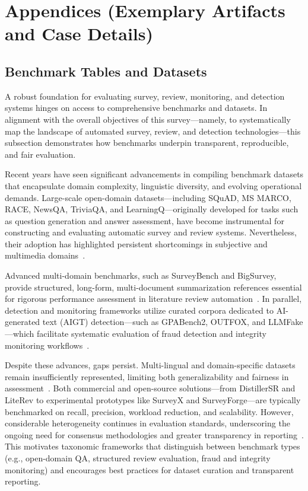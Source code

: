 \documentclass[sigconf]{acmart}
\begin{document}
\section{Appendices (Exemplary Artifacts and Case Details)}

\subsection{Benchmark Tables and Datasets}

A robust foundation for evaluating survey, review, monitoring, and detection systems hinges on access to comprehensive benchmarks and datasets. In alignment with the overall objectives of this survey---namely, to systematically map the landscape of automated survey, review, and detection technologies---this subsection demonstrates how benchmarks underpin transparent, reproducible, and fair evaluation.

Recent years have seen significant advancements in compiling benchmark datasets that encapsulate domain complexity, linguistic diversity, and evolving operational demands. Large-scale open-domain datasets—including SQuAD, MS MARCO, RACE, NewsQA, TriviaQA, and LearningQ—originally developed for tasks such as question generation and answer assessment, have become instrumental for constructing and evaluating automatic survey and review systems. Nevertheless, their adoption has highlighted persistent shortcomings in subjective and multimedia domains~\cite{ref77,ref78,ref80}.

Advanced multi-domain benchmarks, such as SurveyBench and BigSurvey, provide structured, long-form, multi-document summarization references essential for rigorous performance assessment in literature review automation~\cite{ref102,ref104}. In parallel, detection and monitoring frameworks utilize curated corpora dedicated to AI-generated text (AIGT) detection—such as GPABench2, OUTFOX, and LLMFake—which facilitate systematic evaluation of fraud detection and integrity monitoring workflows~\cite{ref91,ref94,ref95}.

Despite these advances, gaps persist. Multi-lingual and domain-specific datasets remain insufficiently represented, limiting both generalizability and fairness in assessment~\cite{ref92,ref113}. Both commercial and open-source solutions—from DistillerSR and LiteRev to experimental prototypes like SurveyX and SurveyForge—are typically benchmarked on recall, precision, workload reduction, and scalability. However, considerable heterogeneity continues in evaluation standards, underscoring the ongoing need for consensus methodologies and greater transparency in reporting~\cite{ref88,ref90,ref91,ref92,ref111,ref112,ref113,ref114,ref115}. This motivates taxonomic frameworks that distinguish between benchmark types (e.g., open-domain QA, structured review evaluation, fraud and integrity monitoring) and encourages best practices for dataset curation and transparent reporting.
\end{document}

